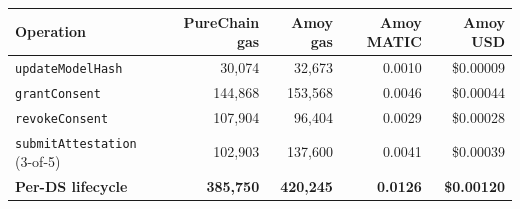\begin{tabular}{lrrrr}
\toprule
Operation & PureChain gas & Amoy gas & Amoy MATIC & Amoy USD \\
\midrule
\texttt{updateModelHash} & 30,074 & 32,673 & 0.0010 & \$0.00009 \\
\texttt{grantConsent} & 144,868 & 153,568 & 0.0046 & \$0.00044 \\
\texttt{revokeConsent} & 107,904 & 96,404 & 0.0029 & \$0.00028 \\
\texttt{submitAttestation} (3-of-5) & 102,903 & 137,600 & 0.0041 & \$0.00039 \\
\midrule
\textbf{Per-DS lifecycle} & \textbf{385,750} & \textbf{420,245} & \textbf{0.0126} & \textbf{\$0.00120} \\
\bottomrule
\end{tabular}
